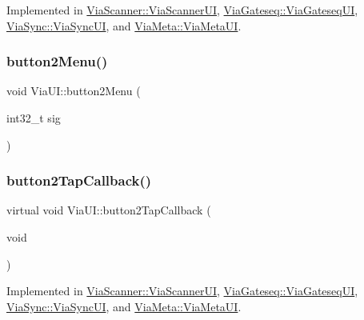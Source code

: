 Implemented in \mbox{\hyperlink{class_via_scanner_1_1_via_scanner_u_i_a9c61e3d9d4c2bf5ed21e63693c575c31}{Via\+Scanner\+::\+Via\+Scanner\+UI}}, \mbox{\hyperlink{class_via_gateseq_1_1_via_gateseq_u_i_a55e439bbec7d63aa2f0e732ec72aa2a2}{Via\+Gateseq\+::\+Via\+Gateseq\+UI}}, \mbox{\hyperlink{class_via_sync_1_1_via_sync_u_i_ad3759b21040068b5bf4ad9fd518b1c4c}{Via\+Sync\+::\+Via\+Sync\+UI}}, and \mbox{\hyperlink{class_via_meta_1_1_via_meta_u_i_acf5ef9a82372db43ab80437747167d9f}{Via\+Meta\+::\+Via\+Meta\+UI}}.

\mbox{\label{class_via_u_i_a98cab09e693942478ce7136e3077276a}} 
\subsubsection{\texorpdfstring{button2\+Menu()}{button2Menu()}}
{\footnotesize\ttfamily void Via\+U\+I\+::button2\+Menu (\begin{DoxyParamCaption}\item[{int32\+\_\+t}]{sig }\end{DoxyParamCaption})}

\mbox{\label{class_via_u_i_a8fce17e375ea6fe3a4746bff3e6dec75}} 
\subsubsection{\texorpdfstring{button2\+Tap\+Callback()}{button2TapCallback()}}
{\footnotesize\ttfamily virtual void Via\+U\+I\+::button2\+Tap\+Callback (\begin{DoxyParamCaption}\item[{void}]{ }\end{DoxyParamCaption})\hspace{0.3cm}{\ttfamily [pure virtual]}}



Implemented in \mbox{\hyperlink{class_via_scanner_1_1_via_scanner_u_i_a18b25c095ac7d6aca3bbc7274643ed9a}{Via\+Scanner\+::\+Via\+Scanner\+UI}}, \mbox{\hyperlink{class_via_gateseq_1_1_via_gateseq_u_i_a9c198960d6fee0bc78d6e24eb18810b1}{Via\+Gateseq\+::\+Via\+Gateseq\+UI}}, \mbox{\hyperlink{class_via_sync_1_1_via_sync_u_i_ac1a33313bc6c5c1f07b3a8cb3094a700}{Via\+Sync\+::\+Via\+Sync\+UI}}, and \mbox{\hyperlink{class_via_meta_1_1_via_meta_u_i_a3d9aa9b0cc62a32b79541e25bbec6bd5}{Via\+Meta\+::\+Via\+Meta\+UI}}.

